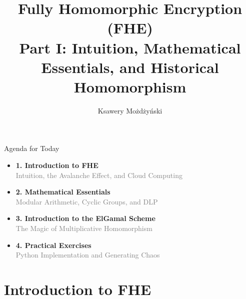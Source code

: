 \documentclass[aspectratio=169, 10pt]{beamer}
\title[FHE - Part I]{\textbf{Fully Homomorphic Encryption (FHE)}\\ \Large Part I: Intuition, Mathematical Essentials, and Historical Homomorphism}
\author{Ksawery Możdżyński}
\date{}
\begin{document}
\begin{frame}
    \titlepage
\end{frame}

\begin{frame}{Agenda for Today}
    \Large
    \begin{itemize}
        \item[\textcolor{AccentOrange}{\faCompass}] \textbf{1. Introduction to FHE} \\
        \textcolor{gray}{\small Intuition, the Avalanche Effect, and Cloud Computing}
        \vspace{0.4cm}
        
        \item[\textcolor{AccentOrange}{\faCalculator}] \textbf{2. Mathematical Essentials} \\
        \textcolor{gray}{\small Modular Arithmetic, Cyclic Groups, and DLP}
        \vspace{0.4cm}
        
        \item[\textcolor{AccentOrange}{\faKey}] \textbf{3. Introduction to the ElGamal Scheme} \\
        \textcolor{gray}{\small The Magic of Multiplicative Homomorphism}
        \vspace{0.4cm}
        
        \item[\textcolor{AccentOrange}{\faLaptopCode}] \textbf{4. Practical Exercises} \\
        \textcolor{gray}{\small Python Implementation and Generating Chaos}
    \end{itemize}
\end{frame}

\section{Introduction to FHE}
\end{document}
